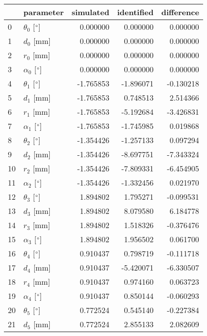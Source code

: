 \documentclass{standalone}%
\begin{document}
%
\normalsize%
\begin{tabular}{llrrr}
\toprule
{} &                 parameter & simulated & identified & difference \\
\midrule
0  &  $\theta_{0}$ [$\degree$] &  0.000000 &   0.000000 &   0.000000 \\
1  &              $d_{0}$ [mm] &  0.000000 &   0.000000 &   0.000000 \\
2  &              $r_{0}$ [mm] &  0.000000 &   0.000000 &   0.000000 \\
3  &  $\alpha_{0}$ [$\degree$] &  0.000000 &   0.000000 &   0.000000 \\
4  &  $\theta_{1}$ [$\degree$] & -1.765853 &  -1.896071 &  -0.130218 \\
5  &              $d_{1}$ [mm] & -1.765853 &   0.748513 &   2.514366 \\
6  &              $r_{1}$ [mm] & -1.765853 &  -5.192684 &  -3.426831 \\
7  &  $\alpha_{1}$ [$\degree$] & -1.765853 &  -1.745985 &   0.019868 \\
8  &  $\theta_{2}$ [$\degree$] & -1.354426 &  -1.257133 &   0.097294 \\
9  &              $d_{2}$ [mm] & -1.354426 &  -8.697751 &  -7.343324 \\
10 &              $r_{2}$ [mm] & -1.354426 &  -7.809331 &  -6.454905 \\
11 &  $\alpha_{2}$ [$\degree$] & -1.354426 &  -1.332456 &   0.021970 \\
12 &  $\theta_{3}$ [$\degree$] &  1.894802 &   1.795271 &  -0.099531 \\
13 &              $d_{3}$ [mm] &  1.894802 &   8.079580 &   6.184778 \\
14 &              $r_{3}$ [mm] &  1.894802 &   1.518326 &  -0.376476 \\
15 &  $\alpha_{3}$ [$\degree$] &  1.894802 &   1.956502 &   0.061700 \\
16 &  $\theta_{4}$ [$\degree$] &  0.910437 &   0.798719 &  -0.111718 \\
17 &              $d_{4}$ [mm] &  0.910437 &  -5.420071 &  -6.330507 \\
18 &              $r_{4}$ [mm] &  0.910437 &   0.974160 &   0.063723 \\
19 &  $\alpha_{4}$ [$\degree$] &  0.910437 &   0.850144 &  -0.060293 \\
20 &  $\theta_{5}$ [$\degree$] &  0.772524 &   0.545140 &  -0.227384 \\
21 &              $d_{5}$ [mm] &  0.772524 &   2.855133 &   2.082609 \\

\end{tabular}
\end{document}
